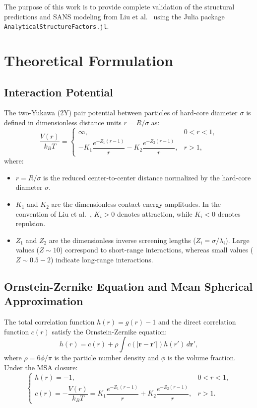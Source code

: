 \documentclass[11pt,a4paper]{article}
\begin{document}
The purpose of this work is to provide complete validation of the structural predictions and SANS modeling from Liu et al.~\cite{liu2005cluster} using the Julia package \texttt{Analytical\-Structure\-Factors.jl}.

\section{Theoretical Formulation}

\subsection{Interaction Potential}

The two-Yukawa (2Y) pair potential between particles of hard-core diameter $\sigma$ is defined in dimensionless distance units $r = R/\sigma$ as:
\begin{equation}
\frac{V(r)}{k_B T} = \begin{cases}
\infty, & 0 < r < 1, \\
-K_1 \dfrac{e^{-Z_1(r-1)}}{r} - K_2 \dfrac{e^{-Z_2(r-1)}}{r}, & r > 1,
\end{cases}
\end{equation}
where:
\begin{itemize}
    \item $r = R/\sigma$ is the reduced center-to-center distance normalized by the hard-core diameter $\sigma$.
    \item $K_1$ and $K_2$ are the dimensionless contact energy amplitudes. In the convention of Liu et al.~\cite{liu2005cluster}, $K_i > 0$ denotes attraction, while $K_i < 0$ denotes repulsion.
    \item $Z_1$ and $Z_2$ are the dimensionless inverse screening lengths ($Z_i = \sigma/\lambda_i$). Large values ($Z \sim 10$) correspond to short-range interactions, whereas small values ($Z \sim 0.5 - 2$) indicate long-range interactions.
\end{itemize}

\subsection{Ornstein-Zernike Equation and Mean Spherical Approximation}

The total correlation function $h(r) = g(r) - 1$ and the direct correlation function $c(r)$ satisfy the Ornstein-Zernike equation:
\begin{equation}
h(r) = c(r) + \rho \int c(|\mathbf{r} - \mathbf{r}'|) h(r') \, d\mathbf{r}',
\end{equation}
where $\rho = 6\phi/\pi$ is the particle number density and $\phi$ is the volume fraction. Under the MSA closure:
\begin{equation}
\begin{cases}
h(r) = -1, & 0 < r < 1, \\
c(r) = -\dfrac{V(r)}{k_B T} = K_1 \dfrac{e^{-Z_1(r-1)}}{r} + K_2 \dfrac{e^{-Z_2(r-1)}}{r}, & r > 1.
\end{cases}
\end{equation}
\end{document}
